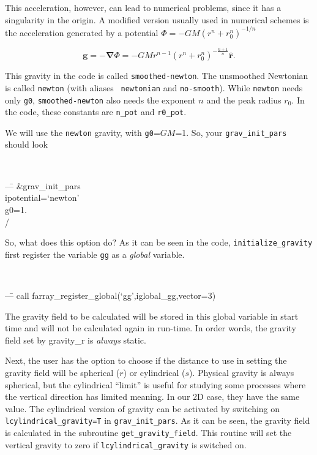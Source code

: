 \documentclass[a4paper,10pt]{article}
\renewcommand{\v}[1]{{\boldsymbol #1}} %
\newcommand{\del}{\v{\nabla}}
\newcommand{\grad}{\del}
\newcommand{\hatr}{\hat{\v{r}}}
\begin{document}
This acceleration, however, can lead to numerical problems, since it has a singularity in the origin. A modified version usually used in numerical schemes is the acceleration generated by a potential $\Phi = -GM(r^n+r_0^n)^{-1/n}$

\begin{equation}
 \v{g} = -\grad{\Phi} =-GM r^{n-1} (r^n + r_0^n)^{-\frac{n+1}{n}} \hatr.
\end{equation}

This gravity in the code is called {\tt smoothed-newton}. The
unsmoothed Newtonian is called {\tt newton} (with aliases {\tt
  newtonian} and {\tt no-smooth}). While {\tt newton}  needs only {\tt g0}, {\tt smoothed-newton} also needs the exponent $n$ and the peak radius $r_0$. In the code, these constants are {\tt n\_pot} and {\tt r0\_pot}. 

We will use the {\tt newton} gravity, with {\tt g0}=$GM$=1. So, your {\tt grav\_init\_pars} should look

{\tt 
\begin{tabbing}
---\=\kill
\&grav\_init\_pars\\
  \>ipotential=`newton'\\
  \>g0=1.\\
/
\end{tabbing}
}

So, what does this option do? As it can be seen in the code, {\tt initialize\_gravity} first register the variable {\tt gg} as a {\it global} variable. 

{\tt 
\begin{tabbing}
  ---\=\kill
\>call farray\_register\_global(`gg',iglobal\_gg,vector=3)\\
\end{tabbing}
}

The gravity field to be calculated will be stored in this global variable in start time and will not be calculated again in run-time. In order words, the gravity field set by gravity\_r is {\it always} static. 

Next, the user has the option to choose if the distance to use in setting the gravity field will be spherical ($r$) or cylindrical ($s$). Physical gravity is always spherical, but the cylindrical ``limit'' is useful for studying some processes where the vertical direction has limited meaning. In our 2D case, they have the same value. The cylindrical version of gravity can be activated by switching on {\tt lcylindrical\_gravity=T} in {\tt grav\_init\_pars}. As it can be seen, the gravity field is calculated in the subroutine {\tt get\_gravity\_field}. This routine will set the vertical gravity to zero if {\tt lcylindrical\_gravity} is switched on. 
\end{document}
